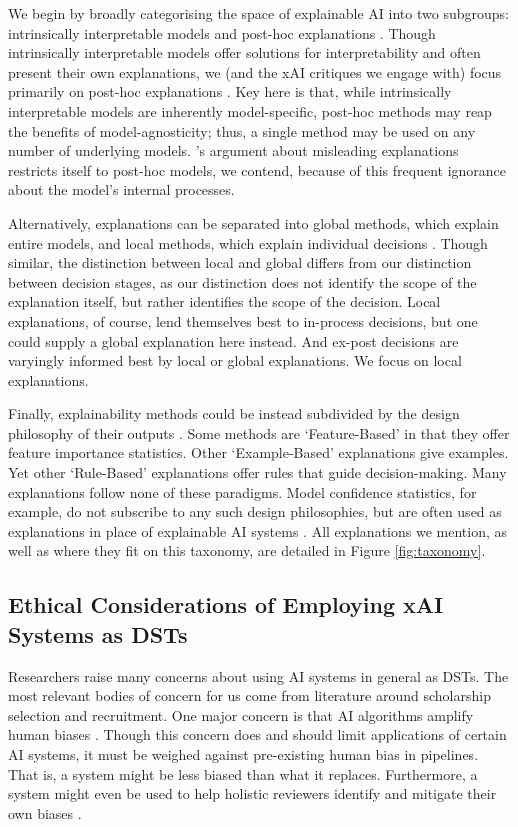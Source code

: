 We begin by broadly categorising the space of explainable AI into two subgroups: intrinsically interpretable models and post-hoc explanations \cite{molnar_interpretable_2019}. Though intrinsically interpretable models offer solutions for interpretability and often present their own explanations, we (and the xAI critiques we engage with) focus primarily on post-hoc explanations \cite{molnar_interpretable_2019}. Key here is that, while intrinsically interpretable models are inherently model-specific, post-hoc methods may reap the benefits of model-agnosticity; thus, a single method may be used on any number of underlying models. \textcite{Lipton}'s argument about misleading explanations restricts itself to post-hoc models, we contend, because of this frequent ignorance about the model's internal processes.

Alternatively, explanations can be separated into global methods, which explain entire models, and local methods, which explain individual decisions \cite{molnar_interpretable_2019}. Though similar, the distinction between local and global differs from our distinction between decision stages, as our distinction does not identify the scope of the explanation itself, but rather identifies the scope of the decision. Local explanations, of course, lend themselves best to in-process decisions, but one could supply a global explanation here instead. And ex-post decisions are varyingly informed best by local or global explanations. We focus on local explanations.

Finally, explainability methods could be instead subdivided by the design philosophy of their outputs \cite{friedrich_taxonomy_2011}. Some methods are `Feature-Based' in that they offer feature importance statistics. Other `Example-Based' explanations give examples. Yet other `Rule-Based' explanations offer rules that guide decision-making. Many explanations follow none of these paradigms. Model confidence statistics, for example, do not subscribe to any such design philosophies, but are often used as explanations in place of explainable AI systems \cite{zhang_effect_2020}. All explanations we mention, as well as where they fit on this taxonomy, are detailed in Figure \ref{fig:taxonomy}.

\subsection{Ethical Considerations of Employing xAI Systems as DSTs}
Researchers raise many concerns about using AI systems in general as DSTs. The most relevant bodies of concern for us come from literature around scholarship selection and recruitment. One major concern is that AI algorithms amplify human biases \cite{MikePerkins_JasperRoe_2023}. Though this concern does and should limit applications of certain AI systems, it must be weighed against pre-existing human bias in pipelines. That is, a system might be less biased than what it replaces. Furthermore, a system might even be used to help holistic reviewers identify and mitigate their own biases \cite{alvero_ai_2020}.

